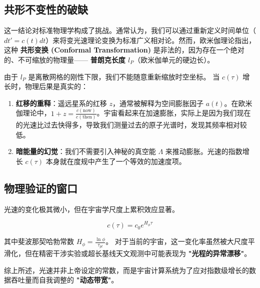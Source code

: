 \subsection{共形不变性的破缺}

这一结论对标准物理学构成了挑战。通常认为，我们可以通过重新定义时间单位（$dt' = c(t) dt$）来将变光速理论变换为标准广义相对论。然而，欧米伽理论指出，这种 \textbf{共形变换 (Conformal Transformation)} 是非法的，因为存在一个绝对的、不可缩放的物理量—— \textbf{普朗克长度 $l_P$}（欧米伽单元的硬边长）。

由于 $l_P$ 是离散网格的刚性下限，我们不能随意重新缩放时空坐标。
当 $c(\tau)$ 增长时，物理后果是真实的：

\begin{enumerate}
\item \textbf{红移的重释}：遥远星系的红移 $z$，通常被解释为空间膨胀因子 $a(t)$。在欧米伽理论中，$1+z = \frac{c(\text{now})}{c(\text{then})}$。宇宙看起来在加速膨胀，实际上是因为我们现在的光速比过去快得多，导致我们测量过去的原子光谱时，发现其频率相对较低。
\item \textbf{暗能量的幻觉}：我们不需要引入神秘的真空能 $\Lambda$ 来推动膨胀。光速的指数增长 $c(\tau)$ 本身就在度规中产生了一个等效的加速度项。
\end{enumerate}

\subsection{物理验证的窗口}

光速的变化极其微小，但在宇宙学尺度上累积效应显著。

\[c(\tau) = c_0 e^{H_\phi \tau}\]

其中斐波那契哈勃常数 $H_\phi = \frac{\ln \phi}{\tau_{pl}}$。
对于当前的宇宙，这一变化率虽然被大尺度平滑化，但在精密干涉实验或超长基线天文观测中可能表现为 \textbf{"光程的异常漂移"}。

综上所述，光速并非上帝设定的常数，而是宇宙计算系统为了应对指数级增长的数据吞吐量而自我调整的 \textbf{"动态带宽"}。
